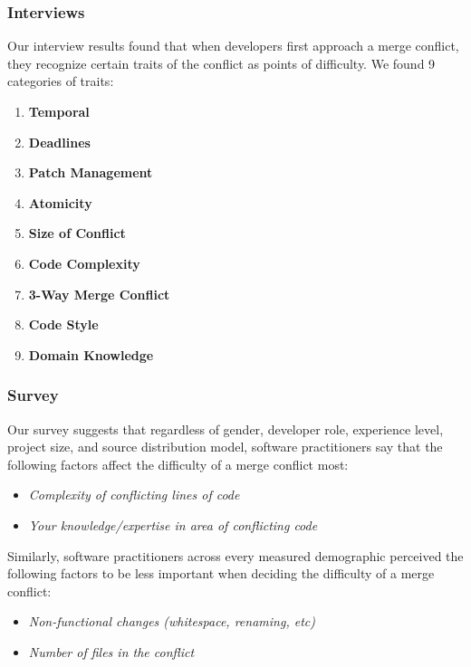 
\subsubsection{Interviews}

Our interview results found that when developers first approach a merge conflict, they recognize certain traits of the conflict as points of difficulty. We found 9 categories of traits:
\begin{enumerate}
\item \textbf{Temporal}
\item \textbf{Deadlines}
\item \textbf{Patch Management}
\item \textbf{Atomicity}
\item \textbf{Size of Conflict}
\item \textbf{Code Complexity}
\item \textbf{3-Way Merge Conflict}
\item \textbf{Code Style}
\item \textbf{Domain Knowledge}
\end{enumerate}


\subsubsection{Survey}
Our survey suggests that regardless of gender, developer role, experience level, project size, and source distribution model, software practitioners say that the following factors affect the difficulty of a merge conflict most: 
\begin{itemize}
\item \textit{Complexity of conflicting lines of code}
\item \textit{Your knowledge/expertise in area of conflicting code}
\end{itemize}

Similarly, software practitioners across every measured demographic perceived the following factors to be less important when deciding the difficulty of a merge conflict:
\begin{itemize}
\item \textit{Non-functional changes (whitespace, renaming, etc)}
\item \textit{Number of files in the conflict}
\end{itemize}

